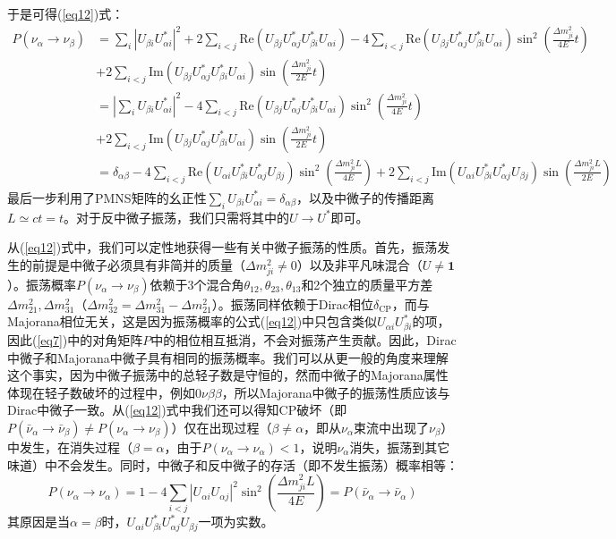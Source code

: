 \documentclass{article}
\begin{document}
	于是可得(\ref{eq12})式：
	\begin{equation*}
		\begin{aligned}
			P(\nu_\alpha\to\nu_\beta)&=\sum_i\left|U_{\beta i}U_{\alpha i}^*\right|^2+2\sum_{i<j}\mathrm{Re}\left(U_{\beta j}U_{\alpha j}^*U_{\beta i}^* U_{\alpha i}\right)-4\sum_{i<j}\mathrm{Re}\left(U_{\beta j}U_{\alpha j}^*U_{\beta i}^* U_{\alpha i}\right)\sin^2\left(\frac{\Delta m_{ji}^2}{4E}t\right)\\
			&+2\sum_{i<j}\mathrm{Im}\left(U_{\beta j}U_{\alpha j}^*U_{\beta i}^* U_{\alpha i}\right)\sin\left(\frac{\Delta m_{ji}^2}{2E}t\right)\\
			&=\left|\sum_iU_{\beta i}U_{\alpha i}^*\right|^2-4\sum_{i<j}\mathrm{Re}\left(U_{\beta j}U_{\alpha j}^*U_{\beta i}^* U_{\alpha i}\right)\sin^2\left(\frac{\Delta m_{ji}^2}{4E}t\right)\\
			&+2\sum_{i<j}\mathrm{Im}\left(U_{\beta j}U_{\alpha j}^*U_{\beta i}^* U_{\alpha i}\right)\sin\left(\frac{\Delta m_{ji}^2}{2E}t\right)\\
			&=\delta_{\alpha\beta}-4\sum_{i<j}\mathrm{Re}(U_{\alpha i}U_{\beta i}^\ast U_{\alpha j}^\ast U_{\beta j})\sin^2\left(\frac{\Delta m_{ji}^2L}{4E}\right)+2\sum_{i<j}\mathrm{Im}(U_{\alpha i}U_{\beta i}^\ast U_{\alpha j}^\ast U_{\beta j})\sin\left(\frac{\Delta m_{ji}^2L}{2E}\right)
		\end{aligned}
	\end{equation*}
	最后一步利用了PMNS矩阵的幺正性$\sum_iU_{\beta i}U_{\alpha i}^*=\delta_{\alpha\beta}$，以及中微子的传播距离$L\simeq ct=t$。对于反中微子振荡，我们只需将其中的$U\to U^*$即可。
	
	从(\ref{eq12})式中，我们可以定性地获得一些有关中微子振荡的性质。首先，振荡发生的前提是中微子必须具有非简并的质量（$\Delta m_{ji}^2\ne0$）以及非平凡味混合（$U\ne\mathbf{1}$）。振荡概率$P(\nu_\alpha\to\nu_\beta)$依赖于3个混合角$\theta_{12},\theta_{23},\theta_{13}$和2个独立的质量平方差$\Delta m_{21}^2,\Delta m_{31}^2$（$\Delta m_{32}^2=\Delta m_{31}^2-\Delta m_{21}^2$）。振荡同样依赖于Dirac相位$\delta_\mathrm{CP}$，而与Majorana相位无关，这是因为振荡概率的公式(\ref{eq12})中只包含类似$U_{\alpha i}U_{\beta i}^*$的项，因此(\ref{eq7})中的对角矩阵$P$中的相位相互抵消，不会对振荡产生贡献。因此，Dirac中微子和Majorana中微子具有相同的振荡概率。我们可以从更一般的角度来理解这个事实，因为中微子振荡中的总轻子数是守恒的，然而中微子的Majorana属性体现在轻子数破坏的过程中，例如$0\nu\beta\beta$，所以Majorana中微子的振荡性质应该与Dirac中微子一致。从(\ref{eq12})式中我们还可以得知CP破坏（即$P(\bar{\nu}_\alpha\to\bar{\nu}_\beta)\ne P(\nu_\alpha\to\nu_\beta)$）仅在出现过程（$\beta\ne\alpha$，即从$\nu_\alpha$束流中出现了$\nu_\beta$）中发生，在消失过程（$\beta=\alpha$，由于$P(\nu_\alpha\to\nu_\alpha)<1$，说明$\nu_\alpha$消失，振荡到其它味道）中不会发生。同时，中微子和反中微子的存活（即不发生振荡）概率相等：
		\begin{equation}
			P(\nu_\alpha\to\nu_\alpha)=1-4\sum_{i<j}|U_{\alpha i}U_{\alpha j}|^2\sin^2\left(\frac{\Delta m_{ji}^2L}{4E}\right)=P(\bar{\nu}_\alpha\to\bar{\nu}_\alpha)
			\label{eq13}
		\end{equation}
		其原因是当$\alpha=\beta$时，$U_{\alpha i}U_{\beta i}^*U_{\alpha j}^*U_{\beta j}$一项为实数。
		
\end{document}
